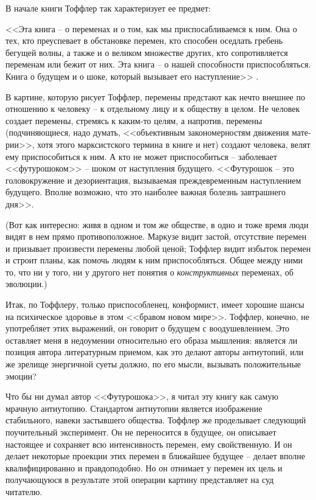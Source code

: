 \documentclass{book}
\begin{document}
В начале книги Тоффлер так характеризует ее предмет:

<<Эта книга -- о переменах и о том, как мы приспосабливаем­ся к ним. Она о тех, кто преуспевает в обстановке перемен, кто способен оседлать гребень бегущей волны, а также и о великом множестве других, кто сопротивляется переменам или бежит от них. Эта книга -- о нашей способности приспособляться. Книга о будущем и о шоке, который вызывает его наступле­ние>>%
.

В картине, которую рисует Тоффлер, перемены предстают как нечто внешнее по отношению к человеку -- к отдельному лицу и к обществу в целом. Не человек создает перемены, стре­мясь к каким-то целям, а напротив, перемены (подчиняющиеся, надо думать, <<объективным закономерностям движения мате­рии>>, хотя этого марксистского термина в книге и нет) созда­ют человека, велят ему приспособиться к ним. А кто не может приспособиться -- заболевает <<футурошоком>> -- шоком от на­ступления будущего. <<Футурошок -- это головокружение и де­зориентация, вызываемая преждевременным наступлением буду­щего. Вполне возможно, что это наиболее важная болезнь завт­рашнего дня>>.%

(Вот как интересно: живя в одном и том же обществе, в од­но и тоже время люди видят в нем прямо противоположное. Маркузе видит застой, отсутствие перемен и призывает произ­вести перемены любой ценой; Тоффлер видит избыток пере­мен и строит планы, как помочь людям к ним приспособлять­ся. Общее между ними то, что ни у того, ни у другого нет поня­тия о \textit{конструктивных}  переменах, об эволюции.)

Итак, по Тоффлеру, только приспособленец, конформист, имеет хорошие шансы на психическое здоровье в этом <<бра­вом новом мире>>. Тоффлер, конечно, не употребляет этих вы­ражений, он говорит о будущем с воодушевлением. Это остав­ляет меня в недоумении относительно его образа мышления: является ли позиция автора литературным приемом, как это делают авторы антиутопий, или же зрелище энергичной суеты должно, по его мысли, вызывать положительные эмоции?

Что бы ни думал автор <<Футурошока>>, я читал эту книгу как самую мрачную антиутопию. Стандартом антиутопии являет­ся изображение стабильного, навеки застывшего общества. Тоффлер же проделывает следующий поучительный экспери­мент. Он не переносится в будущее, он описывает настоящее и сохраняет всю интенсивность перемен, ему свойственную. И он делает некоторые проекции этих перемен в ближайшее буду­щее -- делает вполне квалифицированно и правдоподобно. Но он отнимает у перемен их цель и получающуюся в результате этой операции картину представляет на суд читателю.
\end{document}
